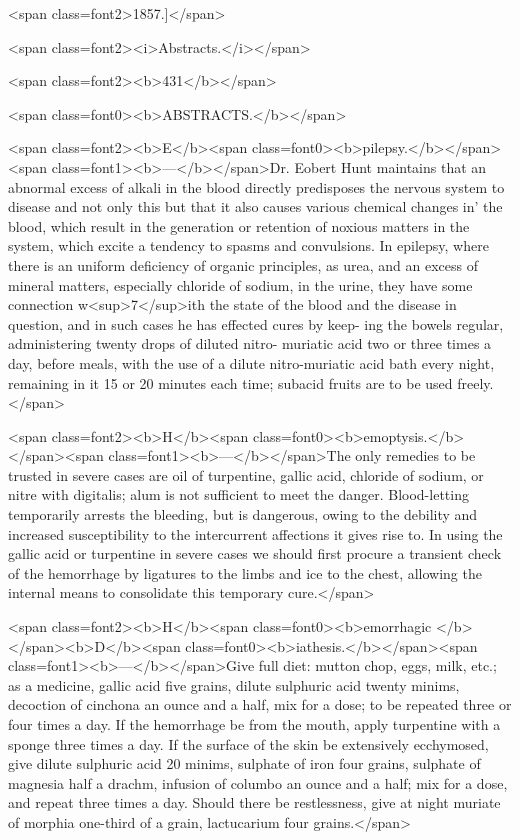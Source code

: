 <span class=font2>1857.]</span>

<span class=font2><i>Abstracts.</i></span>

<span class=font2><b>431</b></span>

<span class=font0><b>ABSTRACTS.</b></span>

<span class=font2><b>E</b><span class=font0><b>pilepsy.</b></span><span class=font1><b>—</b></span>Dr. Eobert Hunt maintains that an abnormal excess of
alkali in the blood directly predisposes the nervous system to disease
and not only this but that it also causes various chemical changes in'
the blood, which result in the generation or retention of noxious matters
in the system, which excite a tendency to spasms and convulsions. In
epilepsy, where there is an uniform deficiency of organic principles, as
urea, and an excess of mineral matters, especially chloride of sodium,
in the urine, they have some connection w<sup>7</sup>ith the state of the blood and
the disease in question, and in such cases he has effected cures by keep-
ing the bowels regular, administering twenty drops of diluted nitro-
muriatic acid two or three times a day, before meals, with the use of a
dilute nitro-muriatic acid bath every night, remaining in it 15 or 20
minutes each time; subacid fruits are to be used freely.</span>

<span class=font2><b>H</b><span class=font0><b>emoptysis.</b></span><span class=font1><b>—</b></span>The only remedies to be trusted in severe cases are oil
of turpentine, gallic acid, chloride of sodium, or nitre with digitalis;
alum is not sufficient to meet the danger. Blood-letting temporarily
arrests the bleeding, but is dangerous, owing to the debility and increased
susceptibility to the intercurrent affections it gives rise to. In using the
gallic acid or turpentine in severe cases we should first procure a transient
check of the hemorrhage by ligatures to the limbs and ice to the chest,
allowing the internal means to consolidate this temporary cure.</span>

<span class=font2><b>H</b><span class=font0><b>emorrhagic </b></span><b>D</b><span class=font0><b>iathesis.</b></span><span class=font1><b>—</b></span>Give full diet: mutton chop, eggs, milk,
etc.; as a medicine, gallic acid five grains, dilute sulphuric acid twenty
minims, decoction of cinchona an ounce and a half, mix for a dose; to
be repeated three or four times a day. If the hemorrhage be from the
mouth, apply turpentine with a sponge three times a day. If the surface
of the skin be extensively ecchymosed, give dilute sulphuric acid 20
minims, sulphate of iron four grains, sulphate of magnesia half a drachm,
infusion of columbo an ounce and a half; mix for a dose, and repeat
three times a day. Should there be restlessness, give at night muriate
of morphia one-third of a grain, lactucarium four grains.</span>

